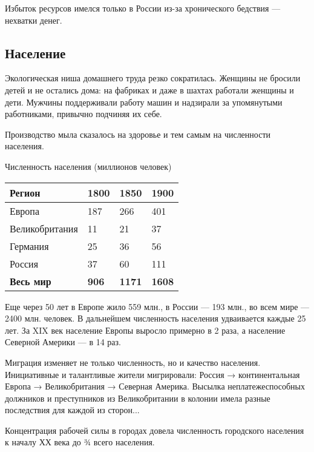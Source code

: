 Избыток ресурсов имелся только в России из-за хронического бедствия — нехватки денег.

\subsection[Население ]{Население}

Экологическая ниша домашнего труда резко сократилась. Женщины не бросили детей и не остались дома: на фабриках и даже в
шахтах работали женщины и дети. Мужчины поддерживали работу машин и надзирали за упомянутыми работниками, привычно
подчиняя их себе.


Производство мыла сказалось на здоровье и тем самым на численности населения.

Численность населения (миллионов человек)
\par

\begin{center}
\tablefirsthead{}
\tablehead{}
\tabletail{}
\tablelasttail{}
\begin{supertabular}{|m{1.1538599in}|m{0.37685984in}|m{0.37685984in}|m{0.38375986in}|}
\hline
\bfseries Регион &
\bfseries 1800 &
\bfseries 1850 &
\bfseries 1900\\\hline
 Европа &
 187 &
 266 &
 401\\\hline
 Великобритания &
 11 &
 21 &
 37\\\hline
 Германия &
 25 &
 36 &
 56\\\hline
 Россия &
 37 &
 60 &
 111\\\hline
\bfseries Весь мир &
\bfseries 906 &
\bfseries 1171 &
\bfseries 1608\\\hline
\end{supertabular}
\end{center}

Еще через 50 лет в Европе жило 559 млн., в России — 193 млн., во всем мире — 2400 млн. человек. В дальнейшем численность
населения удваивается каждые 25 лет. За \foreignlanguage{english}{XIX} век население Европы выросло примерно в 2 раза,
а население Северной Америки — в 14 раз.


Миграция изменяет не только численность, но и качество населения. Инициативные и талантливые жители мигрировали: Россия
→ континентальная Европа → Великобритания → Северная Америка. Высылка неплатежеспособных должников и преступников из
Великобритании в колонии имела разные последствия для каждой из сторон...


Концентрация рабочей силы в городах довела численность городского населения к началу ХХ века до ¾ всего населения.


